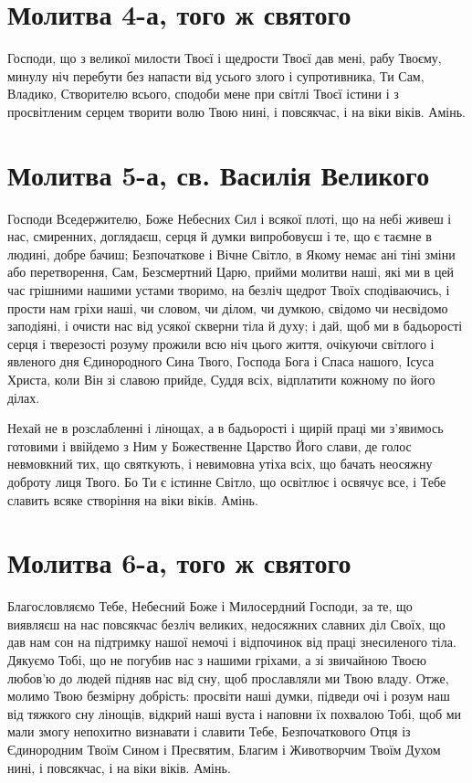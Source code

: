 \documentclass[chapters.tex]{subfiles}
\begin{document}
\section{Молитва 4-а, того ж святого}
Господи, що з великої милости Твоєї і щедрости Твоєї дав мені, рабу Твоєму, минулу ніч перебути без напасти від усього злого і супротивника, Ти Сам, Владико, Створителю всього, сподоби мене при світлі Твоєї істини і з просвітленим серцем творити волю Твою нині, і повсякчас, і на віки віків. Амінь.

\section{Молитва 5-а, св. Василія Великого}
Господи Вседержителю, Боже Небесних Сил і всякої плоті, що на небі живеш і нас, смиренних, доглядаєш, серця й думки випробовуєш і те, що є таємне в людині, добре бачиш; Безпочаткове і Вічне Світло, в Якому немає ані тіні зміни або перетворення, Сам, Безсмертний Царю, прийми молитви наші, які ми в цей час грішними нашими устами творимо, на безліч щедрот Твоїх сподіваючись, і прости нам гріхи наші, чи словом, чи ділом, чи думкою, свідомо чи несвідомо заподіяні, і очисти нас від усякої скверни тіла й духу; і дай, щоб ми в бадьорості серця і тверезості розуму прожили всю ніч цього життя, очікуючи світлого і явленого дня Єдинородного Сина Твого, Господа Бога і Спаса нашого, Ісуса Христа, коли Він зі славою прийде, Суддя всіх, відплатити кожному по його ділах.

Нехай не в розслабленні і лінощах, а в бадьорості і щирій праці ми з’явимось готовими і ввійдемо з Ним у Божественне Царство Його слави, де голос невмовкний тих, що святкують, і невимовна утіха всіх, що бачать неосяжну доброту лиця Твого. Бо Ти є істинне Світло, що освітлює і освячує все, і Тебе славить всяке створіння на віки віків. Амінь.

\section{Молитва 6-а, того ж святого}
Благословляємо Тебе, Небесний Боже і Милосердний Господи, за те, що виявляєш на нас повсякчас безліч великих, недосяжних славних діл Своїх, що дав нам сон на підтримку нашої немочі і відпочинок від праці знесиленого тіла. Дякуємо Тобі, що не погубив нас з нашими гріхами, а зі звичайною Твоєю любов’ю до людей підняв нас від сну, щоб прославляли ми Твою владу. Отже, молимо Твою безмірну добрість: просвіти наші думки, підведи очі і розум наш від тяжкого сну лінощів, відкрий наші вуста і наповни їх похвалою Тобі, щоб ми мали змогу непохитно визнавати і славити Тебе, Безпочаткового Отця із Єдинородним Твоїм Сином і Пресвятим, Благим і Животворчим Твоїм Духом нині, і повсякчас, і на віки віків. Амінь.
\end{document}
